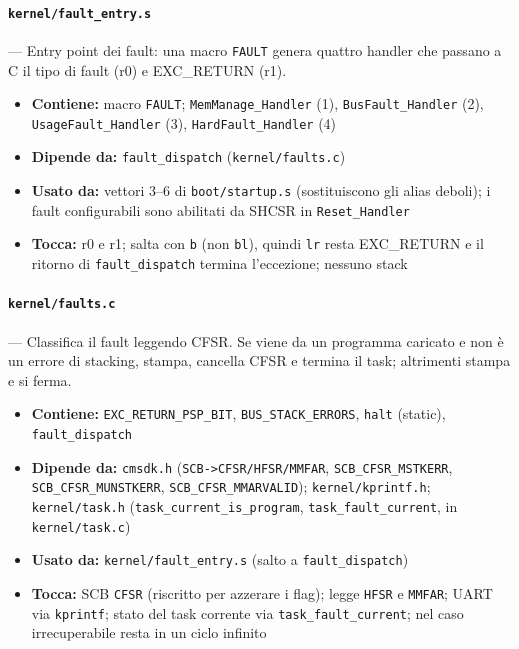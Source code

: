 \paragraph{\texttt{kernel/fault\_entry.s}} --- Entry point dei fault: una macro \texttt{FAULT} genera quattro handler che passano a C il tipo di fault (r0) e EXC\_RETURN (r1).
\begin{itemize}
  \item \textbf{Contiene:} macro \texttt{FAULT}; \texttt{MemManage\_Handler} (1), \texttt{BusFault\_Handler} (2), \texttt{UsageFault\_Handler} (3), \texttt{HardFault\_Handler} (4)
  \item \textbf{Dipende da:} \texttt{fault\_dispatch} (\texttt{kernel/faults.c})
  \item \textbf{Usato da:} vettori 3--6 di \texttt{boot/startup.s} (sostituiscono gli alias deboli); i fault configurabili sono abilitati da SHCSR in \texttt{Reset\_Handler}
  \item \textbf{Tocca:} r0 e r1; salta con \texttt{b} (non \texttt{bl}), quindi \texttt{lr} resta EXC\_RETURN e il ritorno di \texttt{fault\_dispatch} termina l'eccezione; nessuno stack
\end{itemize}

\paragraph{\texttt{kernel/faults.c}} --- Classifica il fault leggendo CFSR. Se viene da un programma caricato e non è un errore di stacking, stampa, cancella CFSR e termina il task; altrimenti stampa e si ferma.
\begin{itemize}
  \item \textbf{Contiene:} \texttt{EXC\_RETURN\_PSP\_BIT}, \texttt{BUS\_STACK\_ERRORS}, \texttt{halt} (static), \texttt{fault\_dispatch}
  \item \textbf{Dipende da:} \texttt{cmsdk.h} (\texttt{SCB->CFSR/HFSR/MMFAR}, \texttt{SCB\_CFSR\_MSTKERR}, \texttt{SCB\_CFSR\_MUNSTKERR}, \texttt{SCB\_CFSR\_MMARVALID}); \texttt{kernel/kprintf.h}; \texttt{kernel/task.h} (\texttt{task\_current\_is\_program}, \texttt{task\_fault\_current}, in \texttt{kernel/task.c})
  \item \textbf{Usato da:} \texttt{kernel/fault\_entry.s} (salto a \texttt{fault\_dispatch})
  \item \textbf{Tocca:} SCB \texttt{CFSR} (riscritto per azzerare i flag); legge \texttt{HFSR} e \texttt{MMFAR}; UART via \texttt{kprintf}; stato del task corrente via \texttt{task\_fault\_current}; nel caso irrecuperabile resta in un ciclo infinito
\end{itemize}

